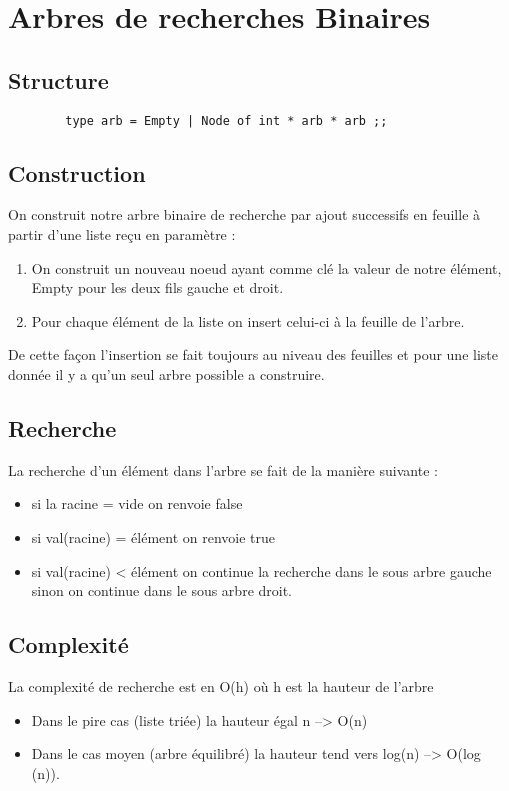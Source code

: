 \chapter{Arbres de recherches Binaires}
\section{Structure}
    \begin{verbatim} 
        type arb = Empty | Node of int * arb * arb ;;
    \end{verbatim}
\section{Construction}
On construit notre arbre binaire de recherche par ajout successifs en feuille à partir d'une liste reçu en paramètre : \\ 
\begin{enumerate}
    \item On construit un nouveau noeud ayant comme clé la valeur de notre élément, Empty pour les deux fils gauche et droit.
    \item Pour chaque élément de la liste on insert celui-ci à la feuille de l'arbre. 
\end{enumerate}
De cette façon l'insertion se fait toujours au niveau des feuilles et pour une liste donnée il y a qu'un seul arbre possible a construire.
\section{Recherche}
La recherche d'un élément dans l'arbre se fait de la manière suivante :\\
\begin{itemize}
    \item si la racine = vide on renvoie false 
    \item si val(racine) = élément on renvoie true 
    \item si val(racine) < élément on continue la recherche dans le sous arbre gauche sinon on continue dans le sous arbre droit.  
\end{itemize}


\section{Complexité}
La complexité de recherche est en O(h) où h est la hauteur de l'arbre\\
\begin{itemize}
    \item Dans le pire cas (liste triée) la hauteur égal n --> O(n)
    \item Dans le cas moyen (arbre équilibré) la hauteur tend vers log(n) --> O(log (n)).
\end{itemize}




